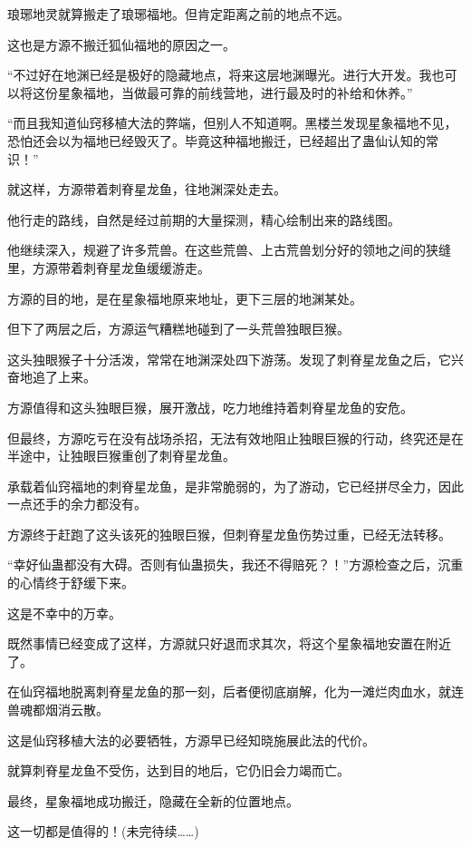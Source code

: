 \begin{this_body}
琅琊地灵就算搬走了琅琊福地。但肯定距离之前的地点不远。

这也是方源不搬迁狐仙福地的原因之一。

“不过好在地渊已经是极好的隐藏地点，将来这层地渊曝光。进行大开发。我也可以将这份星象福地，当做最可靠的前线营地，进行最及时的补给和休养。”

“而且我知道仙窍移植大法的弊端，但别人不知道啊。黑楼兰发现星象福地不见，恐怕还会以为福地已经毁灭了。毕竟这种福地搬迁，已经超出了蛊仙认知的常识！”

就这样，方源带着刺脊星龙鱼，往地渊深处走去。

他行走的路线，自然是经过前期的大量探测，精心绘制出来的路线图。

他继续深入，规避了许多荒兽。在这些荒兽、上古荒兽划分好的领地之间的狭缝里，方源带着刺脊星龙鱼缓缓游走。

方源的目的地，是在星象福地原来地址，更下三层的地渊某处。

但下了两层之后，方源运气糟糕地碰到了一头荒兽独眼巨猴。

这头独眼猴子十分活泼，常常在地渊深处四下游荡。发现了刺脊星龙鱼之后，它兴奋地追了上来。

方源值得和这头独眼巨猴，展开激战，吃力地维持着刺脊星龙鱼的安危。

但最终，方源吃亏在没有战场杀招，无法有效地阻止独眼巨猴的行动，终究还是在半途中，让独眼巨猴重创了刺脊星龙鱼。

承载着仙窍福地的刺脊星龙鱼，是非常脆弱的，为了游动，它已经拼尽全力，因此一点还手的余力都没有。

方源终于赶跑了这头该死的独眼巨猴，但刺脊星龙鱼伤势过重，已经无法转移。

“幸好仙蛊都没有大碍。否则有仙蛊损失，我还不得赔死？！”方源检查之后，沉重的心情终于舒缓下来。

这是不幸中的万幸。

既然事情已经变成了这样，方源就只好退而求其次，将这个星象福地安置在附近了。

在仙窍福地脱离刺脊星龙鱼的那一刻，后者便彻底崩解，化为一滩烂肉血水，就连兽魂都烟消云散。

这是仙窍移植大法的必要牺牲，方源早已经知晓施展此法的代价。

就算刺脊星龙鱼不受伤，达到目的地后，它仍旧会力竭而亡。

最终，星象福地成功搬迁，隐藏在全新的位置地点。

这一切都是值得的！(未完待续……)

\end{this_body}

